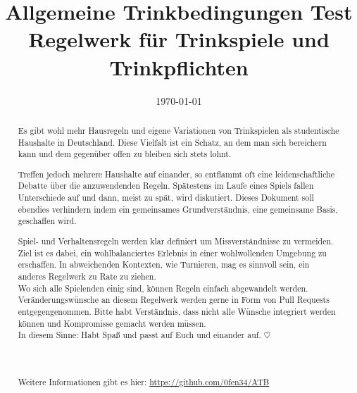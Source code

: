 \documentclass{report}
\title{\Huge Allgemeine Trinkbedingungen Test \\[2ex] \Large Regelwerk für Trinkspiele und Trinkpflichten}
\author{}
\date{\today}
\begin{document}


\maketitle
\begin{abstract}

	Es gibt wohl mehr Hausregeln und eigene Variationen von Trinkspielen als studentische Haushalte in Deutschland.
	Diese Vielfalt ist ein Schatz, an dem man sich bereichern kann und dem gegenüber offen zu bleiben sich stets lohnt.
	
	Treffen jedoch mehrere Haushalte auf einander, so entflammt oft eine leidenschaftliche Debatte über die anzuwendenden Regeln.
	Spätestens im Laufe eines Spiels fallen Unterschiede auf und dann, meist zu spät, wird diskutiert.
	Dieses Dokument soll ebendies verhindern indem ein gemeinsames Grundverständnis, eine gemeinsame Basis, geschaffen wird.

	Spiel- und Verhaltensregeln werden klar definiert um Missverständnisse zu vermeiden.
	Ziel ist es dabei, ein wohlbalanciertes Erlebnis in einer wohlwollenden Umgebung zu erschaffen.
	In abweichenden Kontexten, wie Turnieren, mag es sinnvoll sein, ein anderes Regelwerk zu Rate zu ziehen.
	\\

	Wo sich alle Spielenden einig sind, können Regeln einfach abgewandelt werden.
	Veränderungswünsche an diesem Regelwerk werden gerne in Form von Pull Requests entgegengenommen.
	Bitte habt Verständnis, dass nicht alle Wünsche integriert werden können und Kompromisse gemacht werden müssen.
	\\

	In diesem Sinne: Habt Spaß und passt auf Euch und einander auf.
	\begin{math}
		\heartsuit
	\end{math}
	\\
	\\
	\\
	\\
	Weitere Informationen gibt es hier:
	\url{https://github.com/0fen34/ATB}
\end{abstract}
\tableofcontents
\cleardoublepage{}











\end{document}
